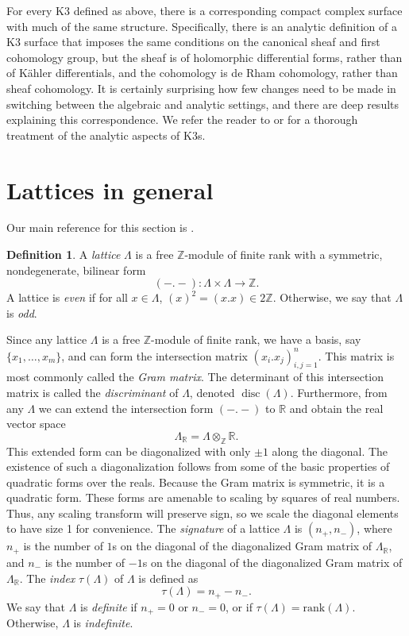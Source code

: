 \documentclass[12pt,twoside]{reedthesis}
\theoremstyle{plain}
\theoremstyle{definition}
\newtheorem{definition}{Definition}[section]
\theoremstyle{remark}
\newcommand{\ZZ}{\mathbb{Z}}
\newcommand{\RR}{\mathbb{R}}
\newcommand{\disc}{\operatorname{disc}}
\begin{document}
For every K3 defined as above, there is a corresponding compact complex surface with much of the same structure. Specifically, there is an analytic definition of a K3 surface that imposes the same conditions on the canonical sheaf and first cohomology group, but the sheaf is of holomorphic differential forms, rather than of K\"ahler differentials, and the cohomology is de Rham cohomology, rather than sheaf cohomology. It is certainly surprising how few changes need to be made in switching between the algebraic and analytic settings, and there are deep results explaining this correspondence. We refer the reader to \cite{huybrechts} or \cite{vanDeVen} for a thorough treatment of the analytic aspects of K3s.
\section{Lattices in general} Our main reference for this section is \cite[Chapter 15]{huybrechts}.
\begin{definition}
A \emph{lattice} $\Lambda$ is a free $\ZZ$-module of finite rank with a symmetric, nondegenerate, bilinear form
\[
(-.-):\Lambda\times\Lambda\to\ZZ.
\]
A lattice is \emph{even} if for all $x\in\Lambda$, $(x)^2=(x.x)\in2\ZZ$. Otherwise, we say that $\Lambda$ is \emph{odd}. 
\end{definition}
\noindent Since any lattice $\Lambda$ is a free $\ZZ$-module of finite rank, we have a basis, say $\{x_1,\ldots,x_m\}$, and can form the intersection matrix $(x_i.x_j)_{i,j=1}^n$. This matrix is most commonly called the \emph{Gram matrix}. The determinant of this intersection matrix is called the \emph{discriminant} of $\Lambda$, denoted $\disc(\Lambda)$. Furthermore, from any $\Lambda$ we can extend the intersection form $(-.-)$ to $\RR$ and obtain the real vector space
\[
\Lambda_\RR=\Lambda\otimes_\ZZ\RR.
\]
This extended form can be diagonalized with only $\pm1$ along the diagonal. The existence of such a diagonalization follows from some of the basic properties of quadratic forms over the reals. Because the Gram matrix is symmetric, it is a quadratic form. These forms are amenable to scaling by squares of real numbers. Thus, any scaling transform will preserve sign, so we scale the diagonal elements to have size 1 for convenience. The \emph{signature} of a lattice $\Lambda$ is $(n_+,n_-)$, where $n_+$ is the number of $1$s on the diagonal of the diagonalized Gram matrix of $\Lambda_\RR$, and $n_-$ is the number of $-1$s on the diagonal of the diagonalized Gram matrix of $\Lambda_\RR$. The \emph{index} $\tau(\Lambda)$ of $\Lambda$ is defined as \[\tau(\Lambda)=n_+-n_-.\] We say that $\Lambda$ is \emph{definite} if $n_+=0$ or $n_-=0$, or if $\tau(\Lambda)=\text{rank}(\Lambda)$. Otherwise, $\Lambda$ is \emph{indefinite}.
\end{document}
